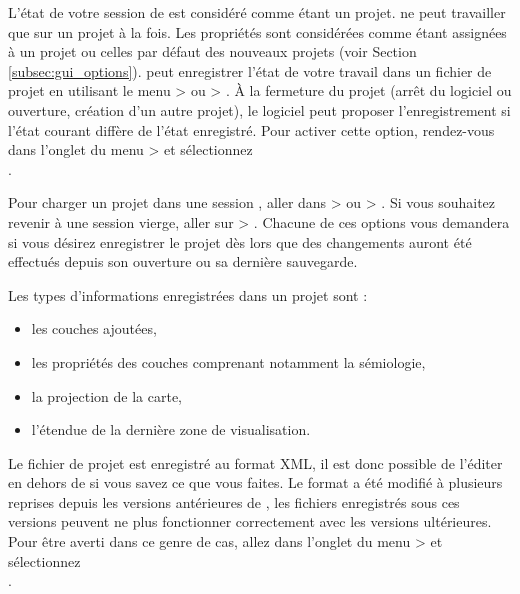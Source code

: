 L'état de votre session de \qg est considéré comme étant un projet. \qg ne peut travailler que sur un projet à la fois. Les propriétés sont considérées comme étant assignées à un projet ou celles par défaut des nouveaux projets (voir Section \ref{subsec:gui_options}). \qg peut enregistrer l'état de votre travail dans un fichier de projet en utilisant le menu  >  ou  > . À la fermeture du projet (arrêt du logiciel ou ouverture, création d'un autre projet), le logiciel peut proposer l'enregistrement si l'état courant diffère de l'état enregistré. Pour activer cette option, rendez-vous dans l'onglet  du menu  >  et sélectionnez\\
.

Pour charger un projet dans une session \qg, aller dans  >  ou  > . Si vous souhaitez revenir à une session vierge, aller sur  > .
Chacune de ces options vous demandera si vous désirez enregistrer le projet dès lors que des changements auront été effectués depuis son ouverture ou sa dernière sauvegarde.

Les types d'informations enregistrées dans un projet sont :

\begin{itemize}[label=--]
\item les couches ajoutées,
\item les propriétés des couches comprenant notamment la sémiologie,
\item la projection de la carte,
\item l'étendue de la dernière zone de visualisation.
\end{itemize}

Le fichier de projet est enregistré au format XML, il est donc possible de l'éditer en dehors de \qg si vous savez ce que vous faites. Le format a été modifié à plusieurs reprises depuis les versions antérieures de \qg, les fichiers enregistrés sous ces versions peuvent ne plus fonctionner correctement avec les versions ultérieures. Pour être averti dans ce genre de cas, allez dans l'onglet  du menu  >  et sélectionnez\\
.

